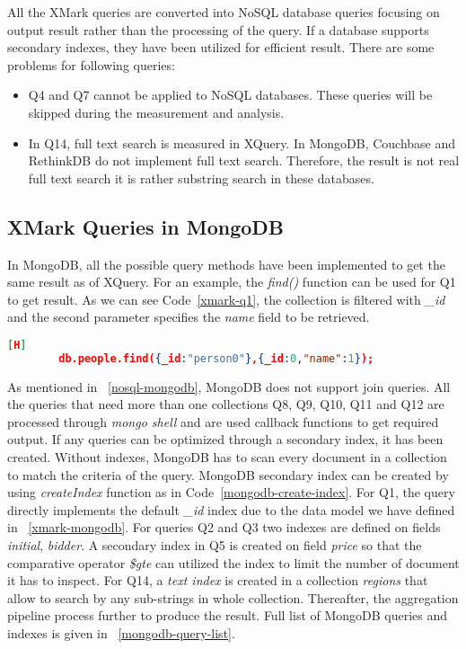 All the XMark queries are converted into NoSQL database queries focusing  on output result rather than the processing of the query. If a database supports secondary indexes, they have been utilized for efficient result. There are some problems for following queries:
\begin{itemize}
\item Q4 and Q7 cannot be applied to NoSQL databases. These queries will be skipped during the measurement and analysis. 
\item In Q14, full text search is measured in XQuery. In MongoDB, Couchbase and RethinkDB do not implement full text search. Therefore, the result is not real full text search it is rather substring search in these databases. 
\end{itemize}

\subsection{XMark Queries in MongoDB}
In MongoDB, all the possible query methods have been implemented to get the same result as of XQuery.  For an example, the \textit{find()} function can be used for Q1 to get result. As we can see Code~\ref{xmark-q1}, the collection is filtered with \textit{\_id}  and the second parameter specifies the \textit{name} field to be retrieved.  
\begin{lstlisting}[language=JSON, caption=XMark Query 1 in MongoDB, label=xmark-q1, basicstyle=\scriptsize][H]
		db.people.find({_id:"person0"},{_id:0,"name":1});
\end{lstlisting}
As mentioned in ~\ref{nosql-mongodb}, MongoDB does not support join queries. All the queries that need more than one collections  Q8, Q9, Q10, Q11 and Q12  are processed through \textit{mongo shell} and are used callback functions to get required output. If any queries can be optimized through a secondary index, it has been created. Without indexes, MongoDB has to scan every document in a collection to match the criteria of the query. MongoDB secondary index can be created by using \textit{createIndex} function as in Code~\ref{mongodb-create-index}.
For Q1, the query directly implements the default \textit{\_id} index due to the data model we have defined in ~\ref{xmark-mongodb}. For queries Q2 and Q3 two indexes are defined on fields \textit{initial}, \textit{bidder}.  A secondary index in Q5 is created on field \textit{price} so that the comparative operator \textit{\$gte} can  utilized the index to limit the number of document it has to inspect. For Q14, a \textit{text index} is created in a collection \textit{regions} that allow to search by any sub-strings in whole collection. Thereafter, the aggregation pipeline process further to produce the result.
Full  list of MongoDB queries and indexes is  given in ~\ref{mongodb-query-list}.

